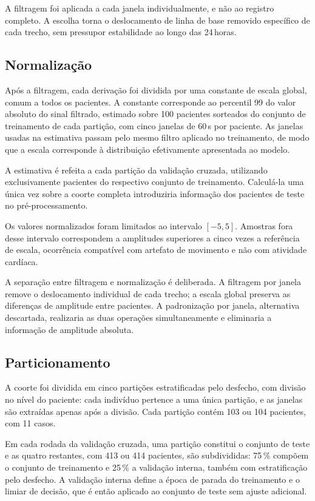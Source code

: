 A filtragem foi aplicada a cada janela individualmente, e não ao registro
completo. A escolha torna o deslocamento de linha de base removido
específico de cada trecho, sem pressupor estabilidade ao longo das 24\,horas.

\subsection{Normalização}
\label{subsec:met-normalizacao}

Após a filtragem, cada derivação foi dividida por uma constante de escala
global, comum a todos os pacientes. A constante corresponde ao percentil 99
do valor absoluto do sinal filtrado, estimado sobre 100 pacientes sorteados
do conjunto de treinamento de cada partição, com cinco janelas de 60\,s por
paciente. As janelas usadas na estimativa passam pelo mesmo filtro aplicado
no treinamento, de modo que a escala corresponde à distribuição efetivamente
apresentada ao modelo.

A estimativa é refeita a cada partição da validação cruzada, utilizando
exclusivamente pacientes do respectivo conjunto de treinamento. Calculá-la
uma única vez sobre a coorte completa introduziria informação dos pacientes
de teste no pré-processamento.

Os valores normalizados foram limitados ao intervalo $[-5, 5]$. Amostras fora
desse intervalo correspondem a amplitudes superiores a cinco vezes a
referência de escala, ocorrência compatível com artefato de movimento e não
com atividade cardíaca.

A separação entre filtragem e normalização é deliberada. A filtragem por
janela remove o deslocamento individual de cada trecho; a escala global
preserva as diferenças de amplitude entre pacientes. A padronização por
janela, alternativa descartada, realizaria as duas operações
simultaneamente e eliminaria a informação de amplitude absoluta.

\subsection{Particionamento}
\label{subsec:met-particionamento}

A coorte foi dividida em cinco partições estratificadas pelo desfecho, com
divisão no nível do paciente: cada indivíduo pertence a uma única partição, e
as janelas são extraídas apenas após a divisão. Cada partição contém 103 ou
104 pacientes, com 11 casos.

Em cada rodada da validação cruzada, uma partição constitui o conjunto de
teste e as quatro restantes, com 413 ou 414 pacientes, são subdivididas: 75\,\%
compõem o conjunto de treinamento e 25\,\% a validação interna, também com
estratificação pelo desfecho. A validação interna define a época de parada do
treinamento e o limiar de decisão, que é então aplicado ao conjunto de teste
sem ajuste adicional.


